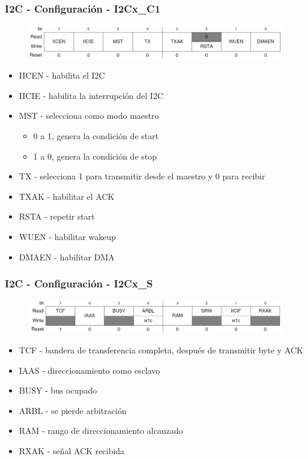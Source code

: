 \documentclass[10.5pt,scale=1.0,t,aspectratio=169,hyperref={pdfpagelabels=false}]{beamer}
\begin{document}
\begin{frame}
	\frametitle{I2C - Configuración -  I2Cx\_C1}
	{\small
		\begin{figure}
			\centering
			\includegraphics[scale=0.6]{28_I2CC1}
		\end{figure}
		
		\begin{multicols}{2}
			\begin{itemize}
				\item IICEN - habilita el I2C
				\item IICIE - habilita la interrupción del I2C
				\item MST - selecciona como modo maestro
				\begin{itemize}
					\item 0 a 1, genera la condición de start
					\item 1 a 0, genera la condición de stop
				\end{itemize}
				\item TX - selecciona 1 para transmitir desde el maestro y 0 para recibir
				\item TXAK - habilitar el ACK
				\item RSTA - repetir start
				\item WUEN - habilitar wakeup
				\item DMAEN - habilitar DMA
			\end{itemize}
		\end{multicols}
			
	}
\end{frame}
\begin{frame} 
	\frametitle{I2C - Configuración -  I2Cx\_S}
	{\small
		\begin{figure}
			\centering
			\includegraphics[scale=0.6]{29_I2CS}
		\end{figure}
		
		\begin{multicols}{2}
			\begin{itemize}
				\item TCF - bandera de transferencia completa, después de transmitir byte y ACK
				\item IAAS - direccionamiento como esclavo
				\item BUSY - bus ocupado
				\item ARBL - se pierde arbitración
				\item RAM - rango de direccionamiento alcanzado
				\item RXAK - señal ACK recibida
			\end{itemize}
		\end{multicols}
		
	}
\end{frame}
\end{document}
